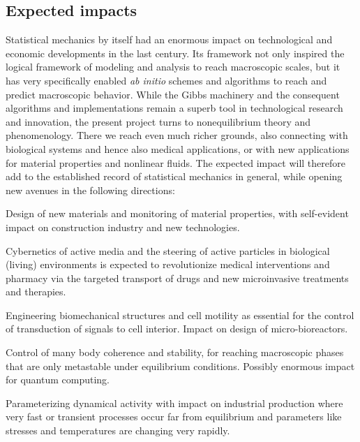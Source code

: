 \subsection{Expected impacts}


Statistical mechanics by itself had an enormous impact on technological and economic
developments in the last century. Its framework not only inspired the logical framework
of modeling and analysis to reach macroscopic scales, but it
has very specifically enabled {\it ab initio} schemes and algorithms to reach and predict
macroscopic behavior.
%
While the Gibbs machinery and the consequent algorithms and implementations remain a superb tool
in technological research and innovation, the present project turns to nonequilibrium theory
and phenomenology. There we reach even much richer grounds, also connecting with biological
systems and hence also medical applications, or with new applications for material properties and nonlinear fluids. The expected impact will therefore add to
the established record of statistical mechanics in general, while opening
new avenues in the following directions:
\begin{compactitem}
\item Design of new materials and monitoring of material properties, with self-evident impact on construction industry and new technologies.
\item Cybernetics of active media and the steering of active particles in biological (living) environments is expected to revolutionize medical
interventions and pharmacy via the targeted transport of drugs and new microinvasive
treatments and therapies.
\item Engineering biomechanical structures and cell motility as essential for the control of transduction
of signals to cell interior. Impact on design of micro-bioreactors.
\item Control of many body coherence and stability, for reaching macroscopic phases that are only metastable under equilibrium conditions.  Possibly enormous impact for quantum computing.
\item Parameterizing dynamical activity with impact on industrial production where very fast or transient processes occur far from equilibrium
and parameters like stresses and temperatures are changing very rapidly.
\end{compactitem}

